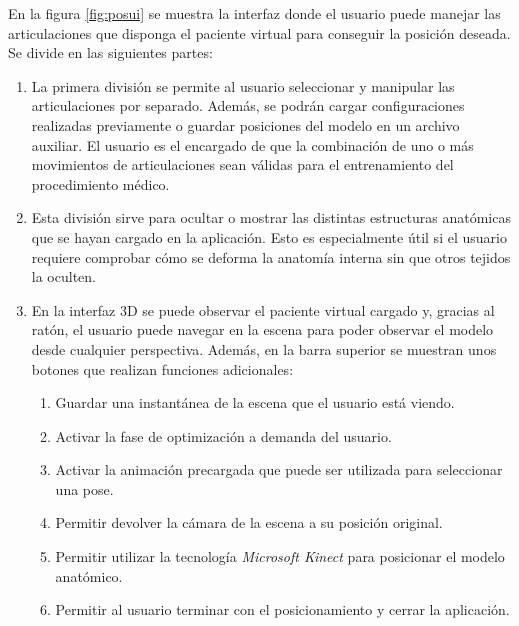 En la figura \ref{fig:posui} se muestra la interfaz donde el usuario puede manejar las articulaciones que disponga el paciente virtual para conseguir la posición deseada. Se divide en las siguientes partes: 
\begin{enumerate}
    \item La primera división se permite al usuario seleccionar y manipular las articulaciones por separado. %
    Además, se podrán cargar configuraciones realizadas previamente o guardar posiciones del modelo en un archivo auxiliar. El usuario es el encargado de que la combinación de uno o más movimientos de articulaciones sean válidas para el entrenamiento del procedimiento médico. 
    \item Esta división sirve para ocultar o mostrar las distintas estructuras anatómicas que se hayan cargado en la aplicación. Esto es especialmente útil si el usuario requiere comprobar cómo se deforma la anatomía interna sin que otros tejidos la oculten. %
    \item En la interfaz 3D se puede observar el paciente virtual cargado y, gracias al ratón, el usuario puede navegar en la escena para poder observar el modelo desde cualquier perspectiva. Además, en la barra superior se muestran unos botones que realizan funciones adicionales:
    \begin{enumerate}
   \item Guardar una instantánea de la escena que el usuario está viendo. 
   \item Activar la fase de optimización a demanda del usuario. 
   \item Activar la animación precargada que puede ser utilizada para seleccionar una pose. 
   \item Permitir devolver la cámara de la escena a su posición original. 
   \item Permitir utilizar la tecnología \emph{Microsoft Kinect} para posicionar el modelo anatómico.
   \item   Permitir al usuario terminar con el posicionamiento y cerrar la aplicación.
    \end{enumerate}
    
\end{enumerate}





